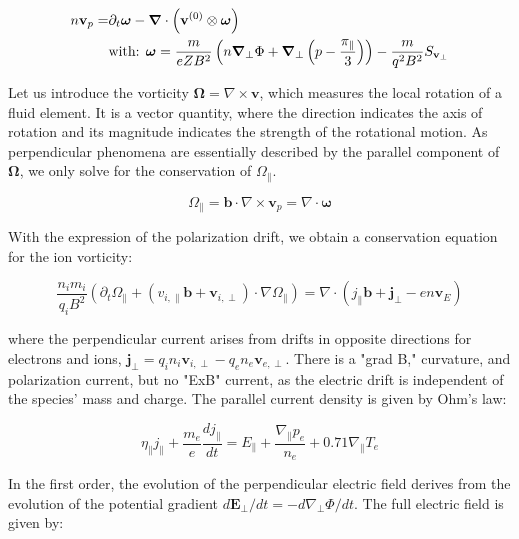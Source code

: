 \begin{align}
	n\mathbf{v}_{p} =& \partial_t\boldsymbol{\omega} - \grad\cdot\left(\mathbf{v}^{(0)}\otimes\boldsymbol{\omega}\right) \nonumber \\
	&\text{with: } \boldsymbol{\omega} = \frac{m}{eZB^2}\left(n\grad_\perp\Phi + \grad_{\perp}\left(p-\frac{\pi_\parallel}{3}\right)\right) - \frac{m}{q^2B^2}S_{\textbf{v}_\perp} \label{eq:definitionSmallOmega}
\end{align}

Let us introduce the vorticity $ \boldsymbol{\Omega} = \nabla \times \mathbf{v}$, which measures the local rotation of a fluid element. It is a vector quantity, where the direction indicates the axis of rotation and its magnitude indicates the strength of the rotational motion. As perpendicular phenomena are essentially described by the parallel component of $\boldsymbol{\Omega}$, we only solve for the conservation of $\Omega_\parallel$. 

\begin{equation}
	\Omega_\parallel = \mathbf{b} \cdot \nabla \times \mathbf{v}_p = \nabla \cdot \boldsymbol{\omega}
\end{equation}

With the expression of the polarization drift, we obtain a conservation equation for the ion vorticity:

\begin{equation}
	\label{eq:edge_vorticityConservation}
	\frac{n_im_i}{q_iB^2}\left(\partial_t\Omega_\parallel + (v_{i,\parallel}\mathbf{b} + \mathbf{v}_{i,\perp})\cdot\nabla\Omega_\parallel\right) = \nabla \cdot \left(j_\parallel\mathbf{b} + \mathbf{j}_\perp - en\mathbf{v}_E\right)
\end{equation}

where the perpendicular current arises from drifts in opposite directions for electrons and ions, $\mathbf{j}_\perp = q_i n_i \mathbf{v}_{i,\perp} - q_e n_e \mathbf{v}_{e,\perp}$. There is a "grad B," curvature, and polarization current, but no "ExB" current, as the electric drift is independent of the species' mass and charge. The parallel current density is given by Ohm's law:

\begin{equation}
	\eta_\parallel j_\parallel + \frac{m_e}{e}\frac{dj_\parallel}{dt} = E_\parallel + \frac{\nabla_\parallel p_e}{n_e} + 0.71\nabla_\parallel T_e
\end{equation}

In the first order, the evolution of the perpendicular electric field derives from the evolution of the potential gradient $d\mathbf{E}_\perp / dt = -d\nabla_\perp \Phi / dt$. The full electric field is given by:

